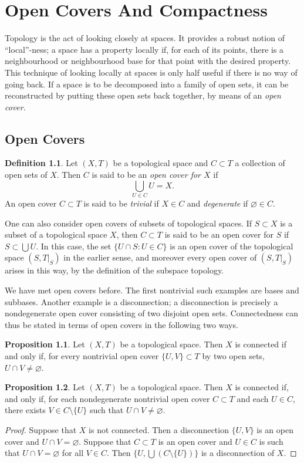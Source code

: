 \documentclass{book}
\theoremstyle{definition}
\newtheorem{proposition}{Proposition}[section]
\newtheorem{definition}{Definition}[section]
\theoremstyle{remark}
\begin{document}
\chapter{Open Covers And Compactness}
Topology is the act of looking closely at spaces. It provides a robust notion of ``local''-ness; a space has a property locally if, for each of its points, there is a neighbourhood or neighbourhood base for that point with the desired property. This technique of looking locally at spaces is only half useful if there is no way of going back. If a space is to be decomposed into a family of open sets, it can be reconstructed by putting these open sets back together, by means of an \textit{open cover}.

\section{Open Covers}
\begin{definition}
Let $(X,T)$ be a topological space and $C\subset T$ a collection of open sets of $X$. Then $C$ is said to be an \textit{open cover for $X$} if
    $$\bigcup_{U\in C} U=X.$$
An open cover $C\subset T$ is said to be \textit{trivial} if $X\in C$ and \textit{degenerate} if $\varnothing\in C$.
\end{definition}

One can also consider open covers of subsets of topological spaces. If $S\subset X$ is a subset of a topological space $X$, then $C\subset T$ is said to be an open cover for $S$ if $S\subset\bigcup U$. In this case, the set $\{U\cap S:U\in C\}$ is an open cover of the topological space $(S, T|_S)$ in the earlier sense, and moreover every open cover of $(S,T|_S)$ arises in this way, by the definition of the subspace topology.

We have met open covers before. The first nontrivial such examples are bases and subbases. Another example is a disconnection; a disconnection is precisely a nondegenerate open cover consisting of two disjoint open sets. Connectedness can thus be stated in terms of open covers in the following two ways.

\begin{proposition}
Let $(X,T)$ be a topological space. Then $X$ is connected if and only if, for every nontrivial open cover $\{U,V\}\subset T$ by two open sets, $U\cap V\neq\varnothing$.
\end{proposition}

\begin{proposition}
Let $(X,T)$ be a topological space. Then $X$ is connected if, and only if, for each nondegenerate nontrivial open cover $C\subset T$ and each $U\in C$, there exists $V\in C\setminus\{U\}$ such that $U\cap V\neq\varnothing$.
\end{proposition}
\begin{proof}
Suppose that $X$ is not connected. Then a disconnection $\{U,V\}$ is an open cover and $U\cap V=\varnothing$. Suppose that $C\subset T$ is an open cover and $U\in C$ is such that $U\cap V=\varnothing$ for all $V\in C$. Then $\{U,\bigcup (C\setminus\{U\})\}$ is a disconnection of $X$.
\end{proof}
\end{document}
